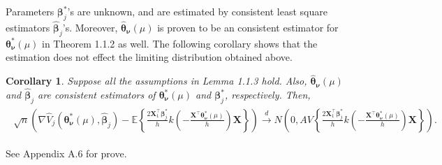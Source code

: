 \documentclass[12pt]{article}
\newcommand{\wh}{\widehat}
\newcommand{\itl}{\intercal}
\newcommand{\bs}{ \boldsymbol}
\newcommand{\lt}{\left}
\newcommand{\rt}{\right}
\newtheorem{corollary}[theorem]{Corollary}
\begin{document}
%
%

Parameters $\bs{\beta}_j^*$'s are unknown, and are estimated by consistent least square estimators $\wh{\bs{\beta}}_j$'s. Moreover, $\wh{\bs{\theta}}_{\bs{\nu}}\lt(\mu\rt)$ is proven to be an consistent estimator for $\bs{\theta}^*_{\bs{\nu}}\lt(\mu\rt)$ in Theorem 1.1.2 as well. The following corollary shows that the estimation does not effect the limiting distribution obtained above.
\begin{corollary}
	Suppose all the assumptions in Lemma 1.1.3 hold. Also, $\wh{\bs{\theta}}_{\bs{\nu}}\lt(\mu\rt)$ and $\widehat{\bs{\beta}}_{j}$ are consistent estimators of $\bs{\theta}^*_{\bs{\nu}}\lt(\mu\rt)$ and $\bs{\beta}_{j}^*$, respectively. Then, 
	\begin{gather}
	\begin{flalign*}
	\sqrt{n}\lt(\nabla\wh{V}_j\lt(\bs{\theta}^*_{\bs{\nu}}\lt(\mu\rt)  , \wh{\bs{\beta}}_j\rt) - \mathbb{E}\lt\{\frac{2\bs{X}_{1}^{\intercal}\bs{\beta}^*_j}{h}k\lt(-\frac{\bs{X}^{\intercal}\bs{\theta}^*_{\bs{\nu}}\lt(\mu\rt)}{h}\rt)\bs{X}\rt\}\rt)\overset{d}{\to}N\lt(0,AV\lt\{\frac{2\bs{X}_1^{\itl}\bs{\beta}^*_j}{h}k\lt(-\frac{\bs{X}^{\itl}\bs{\theta}^*_{\bs{\nu}}\lt(\mu\rt)}{h}\rt)\bs{X}\rt\}\rt).
	\end{flalign*}
	\end{gather}
\end{corollary}
See Appendix A.6 for prove.
\end{document}
